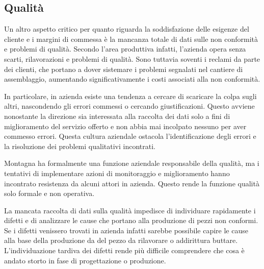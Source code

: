 \subsection{Qualità}
\begin{multicols}{2}
	Un altro aspetto critico per quanto riguarda la soddisfazione delle esigenze del cliente e i margini di commessa è la mancanza totale di dati sulle non conformità e problemi di qualità. Secondo l'area produttiva infatti, l'azienda opera senza scarti, rilavorazioni e problemi di qualità. Sono tuttavia soventi i reclami da parte dei clienti, che portano a dover sistemare i problemi segnalati nel cantiere di assemblaggio, aumentando significativamente i costi associati alla non conformità.

	In particolare, in azienda esiste una tendenza a cercare di scaricare la colpa sugli altri, nascondendo gli errori commessi o cercando giustificazioni. Questo avviene nonostante la direzione sia interessata alla raccolta dei dati solo a fini di miglioramento del servizio offerto e non abbia mai incolpato nessuno per aver commesso errori. Questa cultura aziendale ostacola l'identificazione degli errori e la risoluzione dei problemi qualitativi incontrati.

	Montagna ha formalmente una funzione aziendale responsabile della qualità, ma i tentativi di implementare azioni di monitoraggio e miglioramento hanno incontrato resistenza da alcuni attori in azienda. Questo rende la funzione qualità solo formale e non operativa.

	La mancata raccolta di dati sulla qualità impedisce di individuare rapidamente i difetti e di analizzare le cause che portano alla produzione di pezzi non conformi. Se i difetti venissero trovati in azienda infatti sarebbe possibile capire le cause alla base della produzione da del pezzo da rilavorare o addirittura buttare. L’individuazione tardiva dei difetti rende più difficile comprendere che cosa è andato storto in fase di progettazione o produzione.
\end{multicols}

